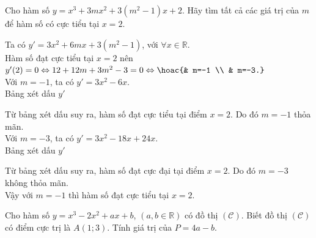 \begin{bt}%
	Cho hàm số $y=x^3+3mx^2+3\left(m^2-1\right)x+2$. Hãy tìm tất cả các giá trị của $m$ để hàm số có cực tiểu tại $x=2$.
	\loigiai
	{Ta có $y'=3x^2+6mx+3\left(m^2-1\right)$, với  $\forall x\in \mathbb{R}$.\\
		Hàm số đạt cực tiểu tại $x=2$ nên $y'(2)=0 \Leftrightarrow 12+12m+3m^2-3=0 \Leftrightarrow \hoac{& m=-1 \\ & m=-3.}$\\
		Với $m=-1$, ta có $y'=3x^2-6x$.\\
		Bảng xét dấu $y'$
		\begin{center}
		\end{center}
		Từ bảng xét dấu suy ra, hàm số đạt cực tiểu tại điểm $x=2$. Do đó $m=-1$ thỏa mãn.\\
		Với $m=-3$, ta có $y'=3x^2-18x+24x$.\\
		Bảng xét dấu $y'$
		\begin{center}
		\end{center}
		Từ bảng xét dấu suy ra, hàm số đạt cực đại tại điểm $x=2$. Do đó $m=-3$ không thỏa mãn.\\
		Vậy với $m=-1$ thì hàm số đạt cực tiểu tại $x=2$.
		}
\end{bt}

\begin{bt}%
	Cho hàm số $y=x^3-2x^2+ax+b$, $(a,b\in \mathbb{R})$ có đồ thị $\mathscr{(C)}$. Biết đồ thị $\mathscr{(C)}$ có điểm cực trị là $A(1;3)$. Tính giá trị của $P=4a-b$.
	
\end{bt}

